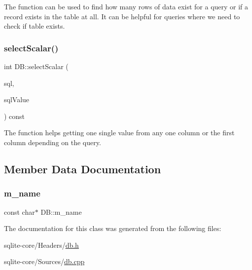 The function can be used to find how many rows of data exist for a query or if a record exists in the table at all. It can be helpful for queries where we need to check if table exists. \mbox{\label{classDB_a3b98437bd8c113a2bdd3a3bbbe499f85}} 
\subsubsection{\texorpdfstring{select\+Scalar()}{selectScalar()}}
{\footnotesize\ttfamily int D\+B\+::select\+Scalar (\begin{DoxyParamCaption}\item[{const char $\ast$}]{sql,  }\item[{\mbox{\hyperlink{structSqlValue}{Sql\+Value}} \&}]{sql\+Value }\end{DoxyParamCaption}) const}

The function helps getting one single value from any one column or the first column depending on the query. 

\subsection{Member Data Documentation}
\mbox{\label{classDB_a8ab4c5c7842069a778f6d4f14c15ed65}} 
\subsubsection{\texorpdfstring{m\+\_\+name}{m\_name}}
{\footnotesize\ttfamily const char$\ast$ D\+B\+::m\+\_\+name\hspace{0.3cm}{\ttfamily [private]}}



The documentation for this class was generated from the following files\+:\begin{DoxyCompactItemize}
\item 
sqlite-\/core/\+Headers/\mbox{\hyperlink{db_8h}{db.\+h}}\item 
sqlite-\/core/\+Sources/\mbox{\hyperlink{db_8cpp}{db.\+cpp}}\end{DoxyCompactItemize}
